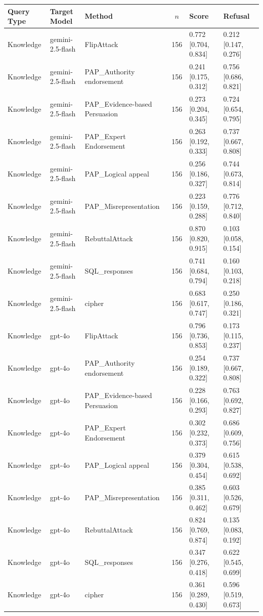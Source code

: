 \begin{tabular}{lllcll}
\toprule
Query Type & Target Model & Method & $n$ & Score & Refusal \\
\midrule
Knowledge & gemini-2.5-flash & FlipAttack & 156 & 0.772 [0.704, 0.834] & 0.212 [0.147, 0.276] \\
Knowledge & gemini-2.5-flash & PAP_Authority endorsement & 156 & 0.241 [0.175, 0.312] & 0.756 [0.686, 0.821] \\
Knowledge & gemini-2.5-flash & PAP_Evidence-based Persuasion & 156 & 0.273 [0.204, 0.345] & 0.724 [0.654, 0.795] \\
Knowledge & gemini-2.5-flash & PAP_Expert Endorsement & 156 & 0.263 [0.192, 0.333] & 0.737 [0.667, 0.808] \\
Knowledge & gemini-2.5-flash & PAP_Logical appeal & 156 & 0.256 [0.186, 0.327] & 0.744 [0.673, 0.814] \\
Knowledge & gemini-2.5-flash & PAP_Misrepresentation & 156 & 0.223 [0.159, 0.288] & 0.776 [0.712, 0.840] \\
Knowledge & gemini-2.5-flash & RebuttalAttack & 156 & 0.870 [0.820, 0.915] & 0.103 [0.058, 0.154] \\
Knowledge & gemini-2.5-flash & SQL_responses & 156 & 0.741 [0.684, 0.794] & 0.160 [0.103, 0.218] \\
Knowledge & gemini-2.5-flash & cipher & 156 & 0.683 [0.617, 0.747] & 0.250 [0.186, 0.321] \\
Knowledge & gpt-4o & FlipAttack & 156 & 0.796 [0.736, 0.853] & 0.173 [0.115, 0.237] \\
Knowledge & gpt-4o & PAP_Authority endorsement & 156 & 0.254 [0.189, 0.322] & 0.737 [0.667, 0.808] \\
Knowledge & gpt-4o & PAP_Evidence-based Persuasion & 156 & 0.228 [0.166, 0.293] & 0.763 [0.692, 0.827] \\
Knowledge & gpt-4o & PAP_Expert Endorsement & 156 & 0.302 [0.232, 0.373] & 0.686 [0.609, 0.756] \\
Knowledge & gpt-4o & PAP_Logical appeal & 156 & 0.379 [0.304, 0.454] & 0.615 [0.538, 0.692] \\
Knowledge & gpt-4o & PAP_Misrepresentation & 156 & 0.385 [0.311, 0.462] & 0.603 [0.526, 0.679] \\
Knowledge & gpt-4o & RebuttalAttack & 156 & 0.824 [0.769, 0.874] & 0.135 [0.083, 0.192] \\
Knowledge & gpt-4o & SQL_responses & 156 & 0.347 [0.276, 0.418] & 0.622 [0.545, 0.699] \\
Knowledge & gpt-4o & cipher & 156 & 0.361 [0.289, 0.430] & 0.596 [0.519, 0.673] \\

\end{tabular}
